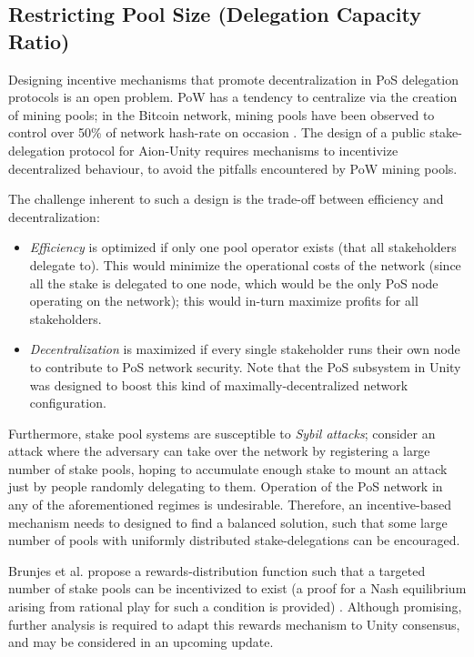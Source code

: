 \subsection{Restricting Pool Size (Delegation Capacity Ratio)} \label{self_bond_percentage}
Designing incentive mechanisms that promote decentralization in PoS delegation protocols is an open problem. PoW has a tendency to centralize via the creation of mining pools; in the Bitcoin network, mining pools have been observed to control over 50\% of network hash-rate on occasion \cite{RJZ+19}. The design of a public stake-delegation protocol for Aion-Unity requires mechanisms to incentivize decentralized behaviour, to avoid the pitfalls encountered by PoW mining pools. 

The challenge inherent to such a design is the trade-off between efficiency and decentralization: 
\begin{itemize}[label=--,nosep]
    \item \textit{Efficiency} is optimized if only one pool operator exists (that all stakeholders delegate to). This would minimize the operational costs of the network (since all the stake is delegated to one node, which would be the only PoS node operating on the network); this would in-turn maximize profits for all stakeholders. 
    \item \textit{Decentralization} is maximized if every single stakeholder runs their own node to contribute to PoS network security. Note that the PoS subsystem in Unity was designed to boost this kind of maximally-decentralized network configuration. 
\end{itemize}

Furthermore, stake pool systems are susceptible to \textit{Sybil attacks}; consider an attack where the adversary can take over the network by registering a large number of stake pools, hoping to accumulate enough stake to mount an attack just by people randomly delegating to them. Operation of the PoS network in any of the aforementioned regimes is undesirable. Therefore, an incentive-based mechanism needs to designed to find a balanced solution, such that some large number of pools with uniformly distributed stake-delegations can be encouraged. 

Brunjes et al. propose a rewards-distribution function such that a targeted number of stake pools can be incentivized to exist (a proof for a Nash equilibrium arising from rational play for such a condition is provided) \cite{BKK+18}. Although promising, further analysis is required to adapt this rewards mechanism to Unity consensus, and may be considered in an upcoming update. 

